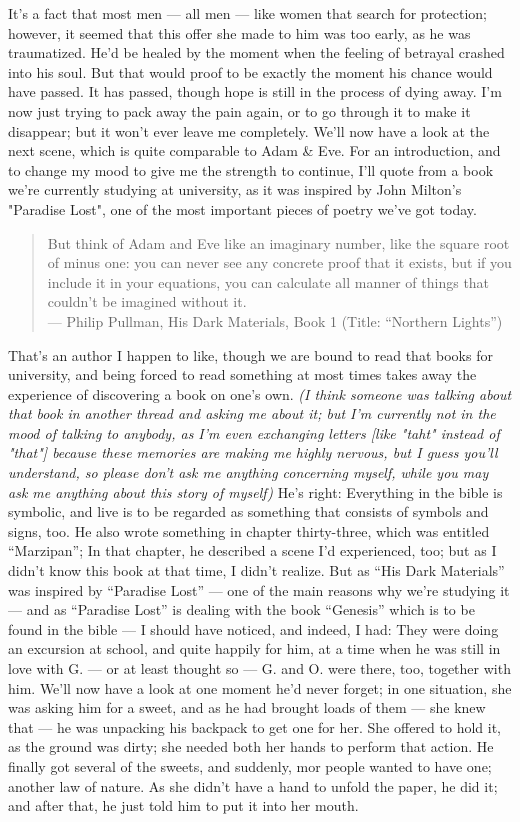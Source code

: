 It's a fact that most men --- all men --- like women that search for protection; however, it seemed that this offer she made to him was too early, as he was traumatized. He'd be healed by the moment when the feeling of betrayal crashed into his soul. 
But that would proof to be exactly the moment his chance would have passed. 
It has passed, though hope is still in the process of dying away. 
I'm now just trying to pack away the pain again, or to go through it to make it disappear; but it won't ever leave me completely. 
We'll now have a look at the next scene, which is quite comparable to Adam \& Eve. 
For an introduction, and to change my mood to give me the strength to continue, I'll quote from a book we're currently studying at university, as it was inspired by John Milton's "Paradise Lost", one of the most important pieces of poetry we've got today. 
\begin{quote}
But think of Adam and Eve like an imaginary number, like the square root of minus one: you can never see any concrete proof that it exists, but if you include it in your equations, you can calculate all manner of things that couldn't be imagined without it.\\
--- Philip Pullman, His Dark Materials, Book 1 (Title: \enquote{Northern Lights})
\end{quote}
That's an author I happen to like, though we are bound to read that books for university, and being forced to read something at most times takes away the experience of discovering a book on one's own. 
\emph{(I think someone was talking about that book in another thread and asking me about it; but I'm currently not in the mood of talking to anybody, as I'm even exchanging letters [like "taht" instead of "that"] because these memories are making me highly nervous, but I guess you'll understand, so please don't ask me anything concerning myself, while you may ask me anything about this story of myself)}
He's right: Everything in the bible is symbolic, and live is to be regarded as something that consists of symbols and signs, too. He also wrote something in chapter thirty-three, which was entitled \enquote{Marzipan}; In that chapter, he described a scene I'd experienced, too; but as I didn't know this book at that time, I didn't realize. But as \enquote{His Dark Materials} was inspired by \enquote{Paradise Lost} --- one of the main reasons why we're studying it --- and as \enquote{Paradise Lost} is dealing with the book \enquote{Genesis} which is to be found in the bible --- I should have noticed, and indeed, I had: 
They were doing an excursion at school, and quite happily for him, at a time when he was still in love with G. --- or at least thought so --- G. and O. were there, too, together with him. 
We'll now have a look at one moment he'd never forget; in one situation, she was asking him for a sweet, and as he had brought loads of them --- she knew that --- he was unpacking his backpack to get one for her. She offered to hold it, as the ground was dirty; she needed both her hands to perform that action. He finally got several of the sweets, and suddenly, mor people wanted to have one; another law of nature. As she didn't have a hand to unfold the paper, he did it; and after that, he just told him to put it into her mouth.

